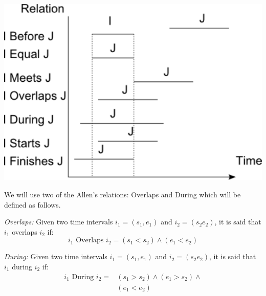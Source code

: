 \begin{samepage}
\vspace*{13pt}
\begin{center}
{
\includegraphics[scale=0.5]{./graphs/allen.pdf}

}
\end{center}
\vspace*{10pt}
\vspace*{13pt}
\end{samepage}

We will use two of the Allen's relations: Overlaps and During which will be defined as follows.

\begin{definition}
\emph{Overlaps:}
 \label{def:overlaps}
Given two time intervals $i_1 = \left(s_1, e_1 \right)$ and $i_2 = \left(s_2 e_2\right)$, it is said that $i_1$ overlaps $i_2$ if:
\begin{equation}
 \label{eqn:overlaps}
i_1 \text{ Overlaps } i_2  = \left(s_1 < s_2  \right) \wedge \left(e_1 < e_2  \right) 
\end{equation}
\end{definition}
  

\begin{definition}
\emph{During:}
 \label{def:during}
Given two time intervals $i_1 = \left(s_1, e_1 \right)$ and $i_2 = \left(s_2 e_2\right)$, it is said that $i_1$ during $i_2$ if:
\begin{align}
 \label{eqn:during}
i_1\text{ During } i_2  =& \left(s_1 > s_2  \right) \wedge \left(e_1 > s_2 \right) \wedge \\
\nonumber & \left(e_1 < e_2 \right)
\end{align}
\end{definition}


